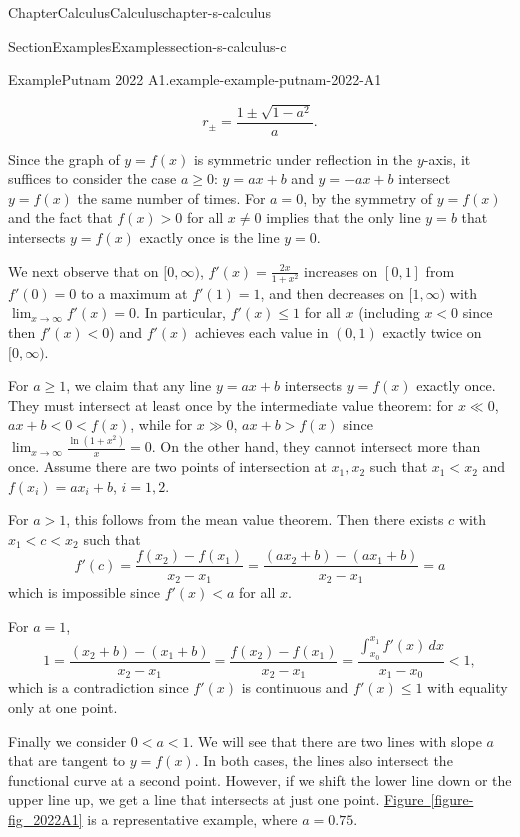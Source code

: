 \documentclass[oneside,10pt,]{book}
\newcommand{\xreffont}{\relax}
\numberwithin{equation}{section}
\newcommand{\lt}{<}
\begin{document}
\begin{chapterptx}{Chapter}{Calculus}{}{Calculus}{}{}{chapter-s-calculus}
\begin{sectionptx}{Section}{Examples}{}{Examples}{}{}{section-s-calculus-c}
\begin{example}{Example}{Putnam 2022 A1.}{example-example-putnam-2022-A1}
\begin{itemize}[label=\textbullet]
\begin{equation*}
r_{\pm} = \frac{1 \pm \sqrt{1-a^2}}{a}.
\end{equation*}
%
\end{itemize}
%
\par
Since the graph of \(y=f(x)\) is symmetric under reflection in the \(y\)-axis, it suffices to consider the case \(a \geq 0\): \(y=ax+b\) and \(y=-ax+b\) intersect \(y=f(x)\) the same number of times. For \(a=0\), by the symmetry of \(y=f(x)\) and the fact that \(f(x)> 0\) for all \(x\neq 0\) implies that the only line \(y=b\) that intersects \(y=f(x)\) exactly once is the line \(y=0\).%
\par
We next observe that on \([0,\infty)\), \(f'(x) = \frac{2x}{1+x^2}\) increases on \([0,1]\) from \(f'(0)=0\) to a maximum at \(f'(1)=1\), and then decreases on \([1,\infty)\) with \(\lim_{x\to\infty} f'(x)=0\). In particular, \(f'(x) \leq 1\) for all \(x\) (including \(x \lt 0\) since then \(f'(x) \lt 0\)) and \(f'(x)\) achieves each value in \((0,1)\) exactly twice on \([0,\infty)\).%
\par
For \(a \geq 1\), we claim that any line \(y=ax+b\) intersects \(y=f(x)\) exactly once. They must intersect at least once by the intermediate value theorem: for \(x \ll 0\), \(ax+b \lt 0 \lt f(x)\), while for \(x \gg 0\), \(ax+b>f(x)\) since \(\lim_{x\to\infty} \frac{\ln(1+x^2)}{x} = 0\). On the other hand, they cannot intersect more than once. Assume there are two points of intersection at \(x_1, x_2\) such that \(x_1 \lt x_2\) and  \(f(x_i)=a x_i + b\), \(i=1,2\).%
\par
For \(a>1\), this follows from the mean value theorem.    Then there exists \(c\) with \(x_1 \lt c \lt x_2\) such that%
\begin{equation*}
f'(c) = \frac{f(x_2)-f(x_1)}{x_2-x_1} = \frac{(a x_2 + b)-(a x_1+b)}{x_2-x_1} = a
\end{equation*}
which is impossible since \(f'(x) \lt a\) for all \(x\).%
\par
For \(a=1\),%
\begin{equation*}
1 = \frac{(x_2+b)-(x_1+b)}{x_2-x_1} =\frac{f(x_2)-f(x_1)}{x_2-x_1}=\frac{\int_{x_0}^{x_1} f'(x)\,dx}{x_1-x_0} \lt 1,
\end{equation*}
which is a contradiction since \(f'(x)\) is continuous and \(f'(x) \leq 1\) with equality only at one point.%
\par
Finally we consider \(0 \lt a \lt 1\). We will see that there are two lines with slope \(a\) that are tangent to \(y=f(x)\).  In both cases, the lines also intersect the functional curve at a second point.  However, if we shift the lower line down or the upper line up, we get a line that intersects at just one point. \hyperref[figure-fig_2022A1]{Figure~{\xreffont\ref{figure-fig_2022A1}}} is a representative example, where \(a=0.75\).%

\end{example}
\end{sectionptx}
\end{chapterptx}
\end{document}
